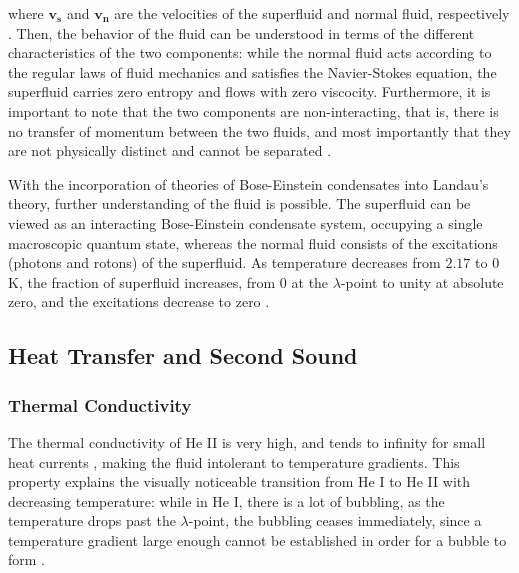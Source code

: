 where $\mathbf{v_s}$ and $\mathbf{v_n}$ are the velocities of the
superfluid and normal fluid, respectively \cite{tilley}. Then, the
behavior of the fluid can be understood in terms of the different
characteristics of the two components: while the normal fluid acts
according to the regular laws of fluid mechanics and satisfies the
Navier-Stokes equation, the superfluid carries zero entropy and flows
with zero viscocity. Furthermore, it is important to note that the two
components are non-interacting, that is, there is no transfer of
momentum between the two fluids, and most importantly that they are
not physically distinct and cannot be separated \cite{tilley}.

With the incorporation of theories of Bose-Einstein condensates into
Landau's theory, further understanding of the fluid is possible. The
superfluid can be viewed as an interacting Bose-Einstein condensate
system, occupying a single macroscopic quantum state, whereas the
normal fluid consists of the excitations (photons and rotons) of the
superfluid. As temperature decreases from $2.17$ to $0$ K, the
fraction of superfluid increases, from $0$ at the $\lambda$-point to
unity at absolute zero, and the excitations decrease to zero .




\subsection{Heat Transfer and Second Sound}

\subsubsection{Thermal Conductivity}
The thermal conductivity of He II is very high, and tends to infinity
for small heat currents \cite{tilley}, making the fluid intolerant
to temperature gradients. This property explains the visually
noticeable transition from He I to He II with decreasing temperature:
while in He I, there is a lot of bubbling, as the temperature drops
past the $\lambda$-point, the bubbling ceases immediately, since a
temperature gradient large enough cannot be established in order for a
bubble to form \cite{tilley}.


